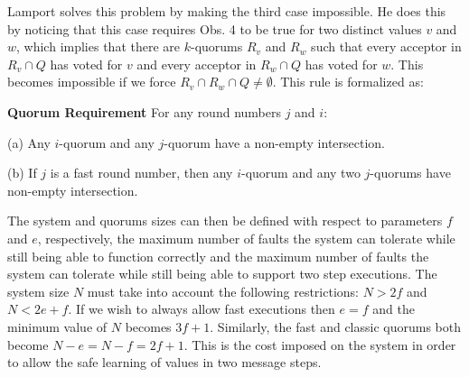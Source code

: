 Lamport solves this problem by making the third case impossible. He does this by noticing that this case requires Obs. 4 to be true for two distinct values $v$ and $w$, which implies that there are $k$-quorums $R_v$ and $R_w$ such that every acceptor in $R_v \cap Q$ has voted for $v$ and every acceptor in $R_w \cap Q$ has voted for $w$. This becomes impossible if we force $R_v \cap R_w \cap Q \neq \emptyset$. This rule is formalized as:

\begin{displayquote}
	\textbf{Quorum Requirement} For any round numbers $j$ and $i$:\par
	(a) Any $i$-quorum and any $j$-quorum have a non-empty intersection.\par
	(b) If $j$ is a fast round number, then any $i$-quorum and any two $j$-quorums have non-empty intersection. 	
\end{displayquote}

The system and quorums sizes can then be defined with respect to parameters $f$ and $e$, respectively, the maximum number of faults the system can tolerate while still being able to function correctly and the maximum number of faults the system can tolerate while still being able to support two step executions. The system size $N$ must take into account the following restrictions: $N > 2f$ and $N < 2e+f$. If we wish to always allow fast executions then $e=f$ and the minimum value of $N$ becomes $3f+1$. Similarly, the fast and classic quorums both become $N-e=N-f= 2f+1$. This is the cost imposed on the system in order to allow the safe learning of values in two message steps. \par